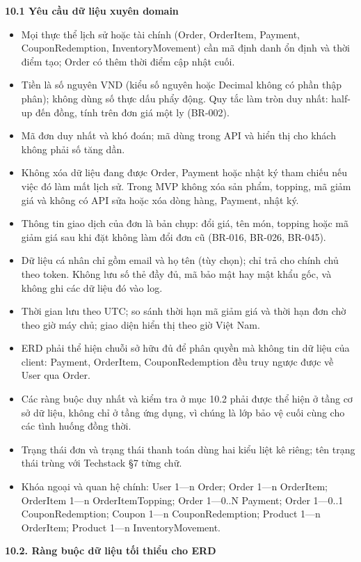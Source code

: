 \documentclass[11pt,a4paper,oneside]{report}
\begin{document}
\textbf{10.1 Yêu cầu dữ liệu xuyên domain}

\begin{itemize}
\item
  Mọi thực thể lịch sử hoặc tài chính (Order, OrderItem, Payment, CouponRedemption, InventoryMovement) cần mã định danh ổn định và thời điểm tạo; Order có thêm thời điểm cập nhật cuối.
\item
  Tiền là số nguyên VND (kiểu số nguyên hoặc Decimal không có phần thập phân); không dùng số thực dấu phẩy động. Quy tắc làm tròn duy nhất: half-up đến đồng, tính trên đơn giá một ly (BR-002).
\item
  Mã đơn duy nhất và khó đoán; mã dùng trong API và hiển thị cho khách không phải số tăng dần.
\item
  Không xóa dữ liệu đang được Order, Payment hoặc nhật ký tham chiếu nếu việc đó làm mất lịch sử. Trong MVP không xóa sản phẩm, topping, mã giảm giá và không có API sửa hoặc xóa dòng hàng, Payment, nhật ký.
\item
  Thông tin giao dịch của đơn là bản chụp: đổi giá, tên món, topping hoặc mã giảm giá sau khi đặt không làm đổi đơn cũ (BR-016, BR-026, BR-045).
\item
  Dữ liệu cá nhân chỉ gồm email và họ tên (tùy chọn); chỉ trả cho chính chủ theo token. Không lưu số thẻ đầy đủ, mã bảo mật hay mật khẩu gốc, và không ghi các dữ liệu đó vào log.
\item
  Thời gian lưu theo UTC; so sánh thời hạn mã giảm giá và thời hạn đơn chờ theo giờ máy chủ; giao diện hiển thị theo giờ Việt Nam.
\item
  ERD phải thể hiện chuỗi sở hữu đủ để phân quyền mà không tin dữ liệu của client: Payment, OrderItem, CouponRedemption đều truy ngược được về User qua Order.
\item
  Các ràng buộc duy nhất và kiểm tra ở mục 10.2 phải được thể hiện ở tầng cơ sở dữ liệu, không chỉ ở tầng ứng dụng, vì chúng là lớp bảo vệ cuối cùng cho các tình huống đồng thời.
\item
  Trạng thái đơn và trạng thái thanh toán dùng hai kiểu liệt kê riêng; tên trạng thái trùng với Techstack §7 từng chữ.
\item
  Khóa ngoại và quan hệ chính: User 1---n Order; Order 1---n OrderItem; OrderItem 1---n OrderItemTopping; Order 1---0..N Payment; Order 1---0..1 CouponRedemption; Coupon 1---n CouponRedemption; Product 1---n OrderItem; Product 1---n InventoryMovement.
\end{itemize}

\textbf{10.2. Ràng buộc dữ liệu tối thiểu cho ERD}
\end{document}
